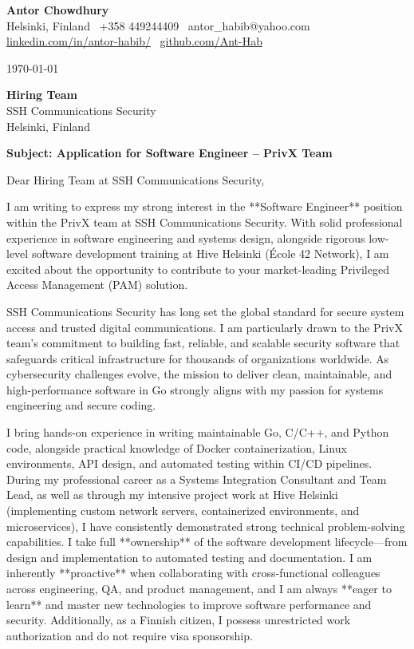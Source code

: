 \documentclass[a4paper,11pt]{article}
\begin{document}
\textbf{Antor Chowdhury}\\
Helsinki, Finland \textbar\ +358 449244409 \textbar\ antor\_habib@yahoo.com\\
\href{https://www.linkedin.com/in/antor-habib/}{linkedin.com/in/antor-habib/} \textbar\ \href{https://github.com/Ant-Hab}{github.com/Ant-Hab}

\vspace{8pt}

\today

\vspace{8pt}

\textbf{Hiring Team}\\
SSH Communications Security\\
Helsinki, Finland

\vspace{8pt}

\textbf{Subject: Application for Software Engineer – PrivX Team}

\vspace{8pt}

Dear Hiring Team at SSH Communications Security,

I am writing to express my strong interest in the **Software Engineer** position within the PrivX team at SSH Communications Security. With solid professional experience in software engineering and systems design, alongside rigorous low-level software development training at Hive Helsinki (École 42 Network), I am excited about the opportunity to contribute to your market-leading Privileged Access Management (PAM) solution.

SSH Communications Security has long set the global standard for secure system access and trusted digital communications. I am particularly drawn to the PrivX team's commitment to building fast, reliable, and scalable security software that safeguards critical infrastructure for thousands of organizations worldwide. As cybersecurity challenges evolve, the mission to deliver clean, maintainable, and high-performance software in Go strongly aligns with my passion for systems engineering and secure coding.

I bring hands-on experience in writing maintainable Go, C/C++, and Python code, alongside practical knowledge of Docker containerization, Linux environments, API design, and automated testing within CI/CD pipelines. During my professional career as a Systems Integration Consultant and Team Lead, as well as through my intensive project work at Hive Helsinki (implementing custom network servers, containerized environments, and microservices), I have consistently demonstrated strong technical problem-solving capabilities. I take full **ownership** of the software development lifecycle—from design and implementation to automated testing and documentation. I am inherently **proactive** when collaborating with cross-functional colleagues across engineering, QA, and product management, and I am always **eager to learn** and master new technologies to improve software performance and security. Additionally, as a Finnish citizen, I possess unrestricted work authorization and do not require visa sponsorship.
\end{document}
